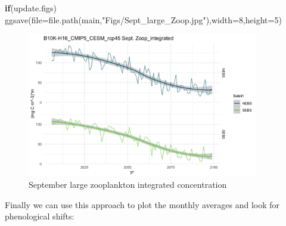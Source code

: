 \documentclass[
]{article}
\newenvironment{Shaded}{\begin{snugshade}}{\end{snugshade}}
\newcommand{\AttributeTok}[1]{\textcolor[rgb]{0.77,0.63,0.00}{#1}}
\newcommand{\ControlFlowTok}[1]{\textcolor[rgb]{0.13,0.29,0.53}{\textbf{#1}}}
\newcommand{\DecValTok}[1]{\textcolor[rgb]{0.00,0.00,0.81}{#1}}
\newcommand{\FunctionTok}[1]{\textcolor[rgb]{0.00,0.00,0.00}{#1}}
\newcommand{\NormalTok}[1]{#1}
\newcommand{\StringTok}[1]{\textcolor[rgb]{0.31,0.60,0.02}{#1}}
\begin{document}
\begin{Shaded}
\begin{Highlighting}[]
  \ControlFlowTok{if}\NormalTok{(update.figs)  }
    \FunctionTok{ggsave}\NormalTok{(}\AttributeTok{file=}\FunctionTok{file.path}\NormalTok{(main,}\StringTok{"Figs/Sept\_large\_Zoop.jpg"}\NormalTok{),}\AttributeTok{width=}\DecValTok{8}\NormalTok{,}\AttributeTok{height=}\DecValTok{5}\NormalTok{)}
\end{Highlighting}
\end{Shaded}

\begin{figure}
\centering
\includegraphics[width=0.9\textwidth,height=\textheight]{Figs/Sept_large_Zoop.jpg}
\caption{September large zooplankton integrated concentration}
\end{figure}

Finally we can use this approach to plot the monthly averages and look
for phenological shifts:
\end{document}

